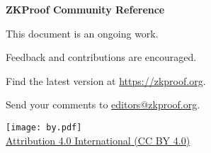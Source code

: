 \begin{center}
\vspace*{5em}
{\bfseries\Huge ZKProof Community Reference}

\vspace{1em} \scalebox{1.15}{Version 0.2 (Draft)}  %


\vspace{2em}
\todayext


\vfill
This document is an ongoing work.

Feedback and contributions are encouraged.

Find the latest version at \url{https://zkproof.org}.

Send your comments to \href{mailto:editors@zkproof.org}{editors@zkproof.org}.


\vfill
\texttt{[image: by.pdf]}\\
\href{https://creativecommons.org/licenses/by/4.0/}{Attribution 4.0 International (CC BY 4.0)}

\end{center}
